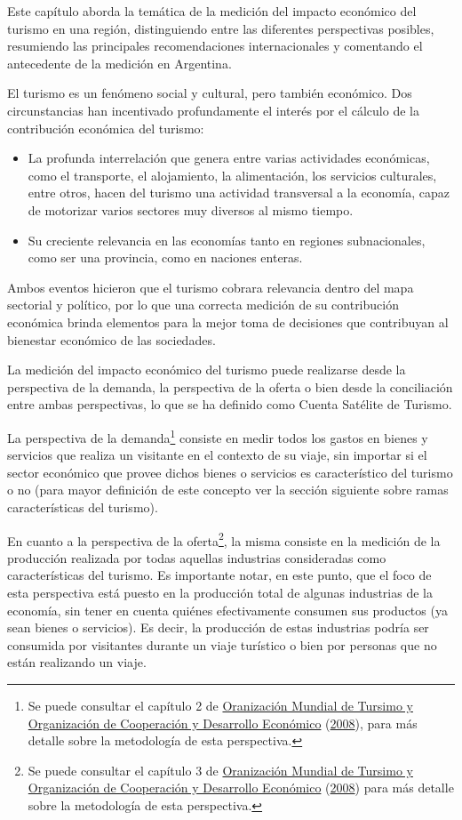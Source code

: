 \documentclass[
  openany]{book}
\begin{document}
Este capítulo aborda la temática de la medición del impacto económico del turismo en una región, distinguiendo entre las diferentes perspectivas posibles, resumiendo las principales recomendaciones internacionales y comentando el antecedente de la medición en Argentina.

El turismo es un fenómeno social y cultural, pero también económico. Dos circunstancias han incentivado profundamente el interés por el cálculo de la contribución económica del turismo:

\begin{itemize}
\item
  La profunda interrelación que genera entre varias actividades económicas, como el transporte, el alojamiento, la alimentación, los servicios culturales, entre otros, hacen del turismo una actividad transversal a la economía, capaz de motorizar varios sectores muy diversos al mismo tiempo.
\item
  Su creciente relevancia en las economías tanto en regiones subnacionales, como ser una provincia, como en naciones enteras.
\end{itemize}

Ambos eventos hicieron que el turismo cobrara relevancia dentro del mapa sectorial y político, por lo que una correcta medición de su contribución económica brinda elementos para la mejor toma de decisiones que contribuyan al bienestar económico de las sociedades.

La medición del impacto económico del turismo puede realizarse desde la perspectiva de la demanda, la perspectiva de la oferta o bien desde la conciliación entre ambas perspectivas, lo que se ha definido como Cuenta Satélite de Turismo.

La perspectiva de la demanda\footnote{Se puede consultar el capítulo 2 de \protect\hyperlink{ref-cstrmc2008}{Oranización Mundial de Tursimo y Organización de Cooperación y Desarrollo Económico} (\protect\hyperlink{ref-cstrmc2008}{2008}), para más detalle sobre la metodología de esta perspectiva.} consiste en medir todos los gastos en bienes y servicios que realiza un visitante en el contexto de su viaje, sin importar si el sector económico que provee dichos bienes o servicios es característico del turismo o no (para mayor definición de este concepto ver la sección siguiente sobre ramas características del turismo).

En cuanto a la perspectiva de la oferta\footnote{Se puede consultar el capítulo 3 de \protect\hyperlink{ref-cstrmc2008}{Oranización Mundial de Tursimo y Organización de Cooperación y Desarrollo Económico} (\protect\hyperlink{ref-cstrmc2008}{2008}) para más detalle sobre la metodología de esta perspectiva.}, la misma consiste en la medición de la producción realizada por todas aquellas industrias consideradas como características del turismo. Es importante notar, en este punto, que el foco de esta perspectiva está puesto en la producción total de algunas industrias de la economía, sin tener en cuenta quiénes efectivamente consumen sus productos (ya sean bienes o servicios). Es decir, la producción de estas industrias podría ser consumida por visitantes durante un viaje turístico o bien por personas que no están realizando un viaje.
\end{document}
